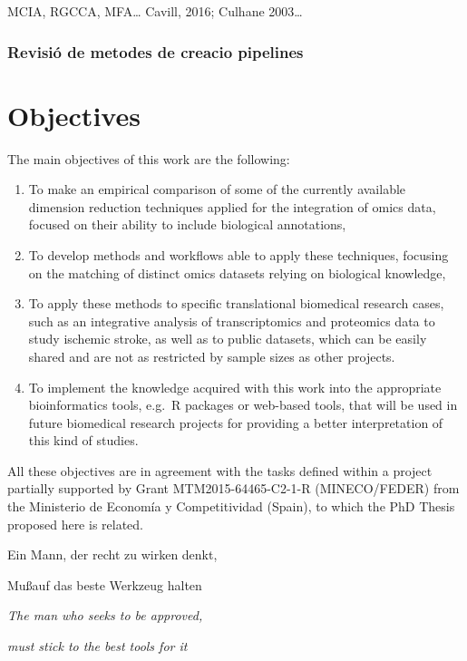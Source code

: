 \documentclass[a4paper, nobind]{templates/ociamthesis}
\renewcommand{\chaptermark}[1]{\markboth{\thechapter. #1}{\thechapter. #1}}
\begin{document}
MCIA, RGCCA, MFA\ldots{} Cavill, 2016; Culhane 2003\ldots{}

\hypertarget{revisiuxf3-de-metodes-de-creacio-pipelines}{%
\subsection{Revisió de metodes de creacio pipelines}\label{revisiuxf3-de-metodes-de-creacio-pipelines}}

\hypertarget{objectives}{%
\chapter{Objectives}\label{objectives}}

\chaptermark{Objectives}

\noindent The main objectives of this work are the following:

\begin{enumerate}
\def\labelenumi{\arabic{enumi}.}
\item
  To make an empirical comparison of some of the currently available dimension reduction techniques applied for the integration of omics data, focused on their ability to include biological annotations,
\item
  To develop methods and workflows able to apply these techniques, focusing on the matching of distinct omics datasets relying on biological knowledge,
\item
  To apply these methods to specific translational biomedical research cases, such as an integrative analysis of transcriptomics and proteomics data to study ischemic stroke, as well as to public datasets, which can be easily shared and are not as restricted by sample sizes as other projects.
\item
  To implement the knowledge acquired with this work into the appropriate bioinformatics tools, e.g.~R packages or web-based tools, that will be used in future biomedical research projects for providing a better interpretation of this kind of studies.
\end{enumerate}

All these objectives are in agreement with the tasks defined within a project partially supported by Grant MTM2015-64465-C2-1-R (MINECO/FEDER) from the Ministerio de Economía y Competitividad (Spain), to which the PhD Thesis proposed here is related.

\begin{savequote}
Ein Mann, der recht zu wirken denkt,

Mu\ss\enspace auf das beste Werkzeug halten

\emph{The man who seeks to be approved,}

\emph{must stick to the best tools for it}
\end{savequote}
\end{document}

